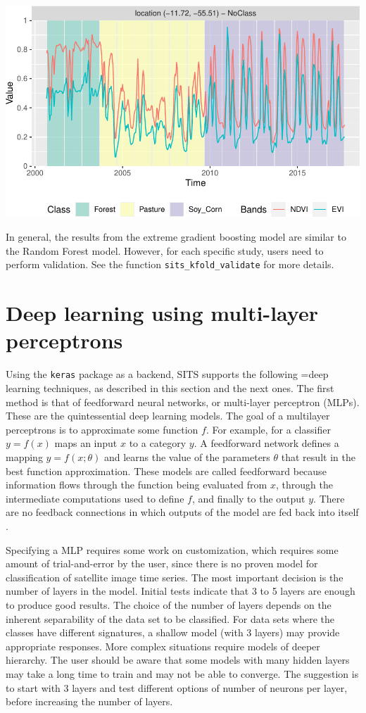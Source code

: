 \documentclass[a4paper,]{tufte-book}
\begin{document}
\begin{center}\includegraphics[width=0.7\linewidth]{sitsbook_files/figure-latex/unnamed-chunk-49-1} \end{center}

In general, the results from the extreme gradient boosting model are similar to the Random Forest model. However, for each specific study, users need to perform validation. See the function \texttt{sits\_kfold\_validate} for more details.

\hypertarget{deep-learning-using-multi-layer-perceptrons}{%
\section{Deep learning using multi-layer perceptrons}\label{deep-learning-using-multi-layer-perceptrons}}

Using the \texttt{keras} package \citep{Chollet2018} as a backend, SITS supports the following =deep learning techniques, as described in this section and the next ones. The first method is that of feedforward neural networks, or multi-layer perceptron (MLPs). These are the quintessential deep learning models. The goal of a multilayer perceptrons is to approximate some function \(f\). For example, for a classifier \(y =f(x)\) maps an input \(x\) to a category \(y\). A feedforward network defines a mapping \(y = f(x;\theta)\) and learns the value of the parameters \(\theta\) that result in the best function approximation. These models are called feedforward because information flows through the function being evaluated from \(x\), through the intermediate computations used to define \(f\), and finally to the output \(y\). There are no feedback connections in which outputs of the model are fed back into itself \citep{Goodfellow2016}.

Specifying a MLP requires some work on customization, which requires some amount of trial-and-error by the user, since there is no proven model for classification of satellite image time series. The most important decision is the number of layers in the model. Initial tests indicate that 3 to 5 layers are enough to produce good results. The choice of the number of layers depends on the inherent separability of the data set to be classified. For data sets where the classes have different signatures, a shallow model (with 3 layers) may provide appropriate responses. More complex situations require models of deeper hierarchy. The user should be aware that some models with many hidden layers may take a long time to train and may not be able to converge. The suggestion is to start with 3 layers and test different options of number of neurons per layer, before increasing the number of layers.
\end{document}
